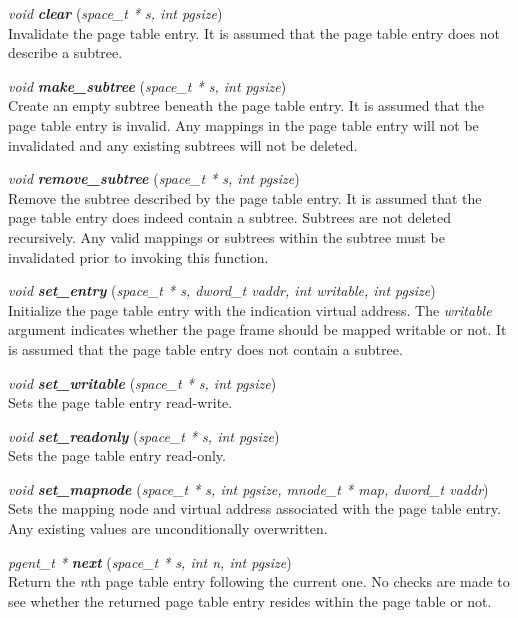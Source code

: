 \documentclass[a4paper,twoside]{book}
\newcommand{\fdecl}[3]{\emph{#1} {\bf\emph{#2}} (\emph{#3})}
\begin{document}
\begin{description}
\item{\fdecl{void}{clear}{space\_t * s, int pgsize}\\} Invalidate the
  page table entry.  It is assumed that the page table entry does not
  describe a subtree.
  
\item{\fdecl{void}{make\_subtree}{space\_t * s, int pgsize}\\} Create
  an empty subtree beneath the page table entry.  It is assumed that
  the page table entry is invalid.  Any mappings in the page table
  entry will not be invalidated and any existing subtrees will not be
  deleted.
  
\item{\fdecl{void}{remove\_subtree}{space\_t * s, int pgsize}\\} Remove
  the subtree described by the page table entry.  It is assumed that
  the page table entry does indeed contain a subtree.  Subtrees are
  not deleted recursively.  Any valid mappings or subtrees within the
  subtree must be invalidated prior to invoking this function.
  
\item{\fdecl{void}{set\_entry}{space\_t * s, dword\_t vaddr, int
      writable, int pgsize}\\} Initialize the page table entry with
  the indication virtual address.  The \emph{writable} argument
  indicates whether the page frame should be mapped writable or not.
  It is assumed that the page table entry does not contain a subtree.
  
\item{\fdecl{void}{set\_writable}{space\_t * s, int pgsize}\\} Sets the
  page table entry read-write.
  
\item{\fdecl{void}{set\_readonly}{space\_t * s, int pgsize}\\} Sets the
  page table entry read-only.
  
\item{\fdecl{void}{set\_mapnode}{space\_t * s, int pgsize, mnode\_t *
      map, dword\_t vaddr}\\} Sets the mapping node and virtual
  address associated with the page table entry.  Any existing values
  are unconditionally overwritten.
  
\item{\fdecl{pgent\_t *}{next}{space\_t * s, int n, int pgsize}\\}
  Return the \emph{n}th page table entry following the current one.
  No checks are made to see whether the returned page table entry
  resides within the page table or not.

\end{description}
\end{document}
